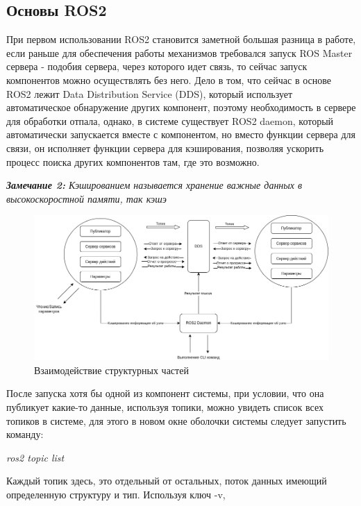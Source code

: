 \documentclass[a4paper, 14pt]{extreport}
\begin{document}
\subsection{Основы ROS2}
\par\noindent При первом использовании ROS2 становится заметной большая разница в работе, если раньше для обеспечения работы 
 механизмов требовался запуск ROS Master сервера - подобия сервера, через которого идет связь, то сейчас запуск компонентов
 можно осуществлять без него. Дело в том, что сейчас в основе ROS2 лежит Data Distribution Service (DDS), который использует
 автоматическое обнаружение других компонент, поэтому необходимость в сервере для обработки отпала, однако, в системе существует
 ROS2 daemon, который автоматически запускается вместе с компонентом, но вместо функции сервера для связи, он исполняет функции
 сервера для кэширования, позволяя ускорить процесс поиска других компонентов там, где это возможно.
\par\noindent \textsl{\textbf{Замечание 2:} Кэшированием называется хранение важные данных в высокоскоростной памяти, так 
кэшэ}
\begin{figure}[ht]
\begin{center}
\includegraphics[scale = 0.5]{./figure/ros2_overview_schema}
\caption{Взаимодействие структурных частей}
\label{fig:manip_photo}
\end{center}
\end{figure}
\par\noindent После запуска хотя бы одной из компонент системы, при условии, что она публикует какие-то данные, используя топики, 
 можно увидеть список всех топиков в системе, для этого в новом окне оболочки системы следует запустить команду:
\begin{center}
        \par \textsl{ros2 topic list}
\end{center}
\par\noindent Каждый топик здесь, это отдельный от остальных, поток данных имеющий определенную структуру и тип. Используя ключ -v, 
\end{document}
